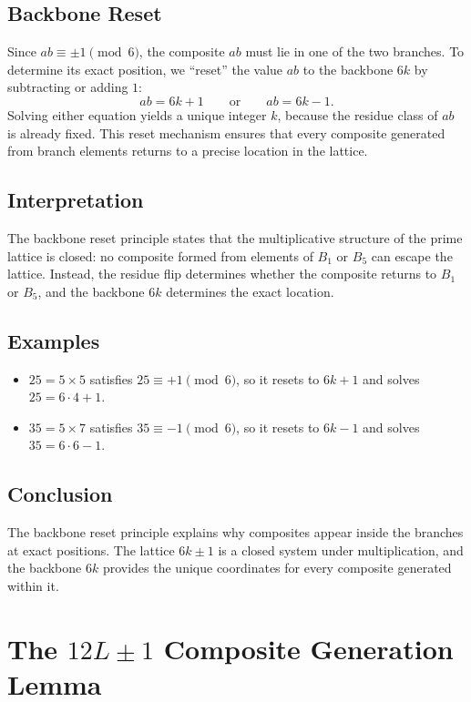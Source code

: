 \documentclass[12pt]{article}
\begin{document}
\subsection*{Backbone Reset}
Since $ab \equiv \pm 1 \pmod{6}$, the composite $ab$ must lie in one of the
two branches. To determine its exact position, we ``reset'' the value $ab$ to
the backbone $6k$ by subtracting or adding $1$:
\[
ab = 6k+1 \qquad \text{or} \qquad ab = 6k-1.
\]
Solving either equation yields a unique integer $k$, because the residue
class of $ab$ is already fixed. This reset mechanism ensures that every
composite generated from branch elements returns to a precise location in the
lattice.

\subsection*{Interpretation}
The backbone reset principle states that the multiplicative structure of the
prime lattice is closed: no composite formed from elements of $B_1$ or $B_5$
can escape the lattice. Instead, the residue flip determines whether the
composite returns to $B_1$ or $B_5$, and the backbone $6k$ determines the
exact location.

\subsection*{Examples}
\begin{itemize}
\item $25 = 5 \times 5$ satisfies $25 \equiv +1 \pmod{6}$, so it resets to
$6k+1$ and solves $25 = 6 \cdot 4 + 1$.

\item $35 = 5 \times 7$ satisfies $35 \equiv -1 \pmod{6}$, so it resets to
$6k-1$ and solves $35 = 6 \cdot 6 - 1$.
\end{itemize}

\subsection*{Conclusion}
The backbone reset principle explains why composites appear inside the
branches at exact positions. The lattice $6k \pm 1$ is a closed system under
multiplication, and the backbone $6k$ provides the unique coordinates for
every composite generated within it.

\section{The $12L\pm1$ Composite Generation Lemma}
\end{document}

